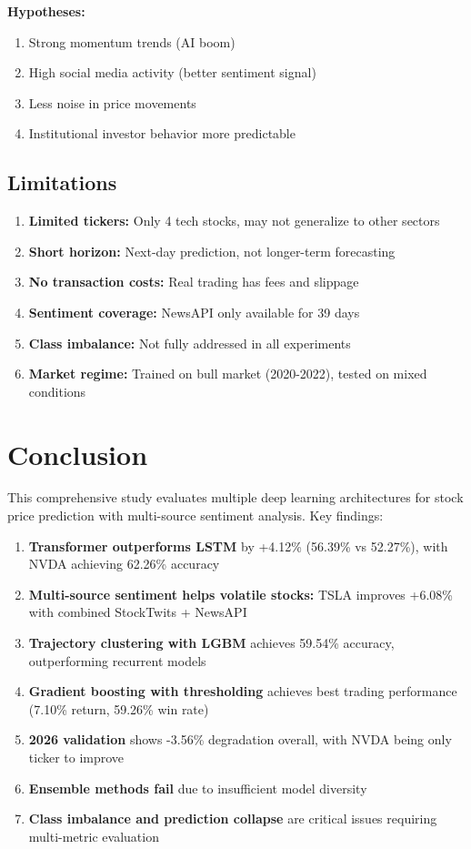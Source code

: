 \documentclass[10pt,twocolumn]{article}
\begin{document}
\textbf{Hypotheses:}
\begin{enumerate}
\item Strong momentum trends (AI boom)
\item High social media activity (better sentiment signal)
\item Less noise in price movements
\item Institutional investor behavior more predictable
\end{enumerate}

\subsection{Limitations}

\begin{enumerate}
\item \textbf{Limited tickers:} Only 4 tech stocks, may not generalize to other sectors
\item \textbf{Short horizon:} Next-day prediction, not longer-term forecasting
\item \textbf{No transaction costs:} Real trading has fees and slippage
\item \textbf{Sentiment coverage:} NewsAPI only available for 39 days
\item \textbf{Class imbalance:} Not fully addressed in all experiments
\item \textbf{Market regime:} Trained on bull market (2020-2022), tested on mixed conditions
\end{enumerate}

\section{Conclusion}

This comprehensive study evaluates multiple deep learning architectures for stock price prediction with multi-source sentiment analysis. Key findings:

\begin{enumerate}
\item \textbf{Transformer outperforms LSTM} by +4.12\% (56.39\% vs 52.27\%), with NVDA achieving 62.26\% accuracy
\item \textbf{Multi-source sentiment helps volatile stocks:} TSLA improves +6.08\% with combined StockTwits + NewsAPI
\item \textbf{Trajectory clustering with LGBM} achieves 59.54\% accuracy, outperforming recurrent models
\item \textbf{Gradient boosting with thresholding} achieves best trading performance (7.10\% return, 59.26\% win rate)
\item \textbf{2026 validation} shows -3.56\% degradation overall, with NVDA being only ticker to improve
\item \textbf{Ensemble methods fail} due to insufficient model diversity
\item \textbf{Class imbalance and prediction collapse} are critical issues requiring multi-metric evaluation
\end{enumerate}
\end{document}
